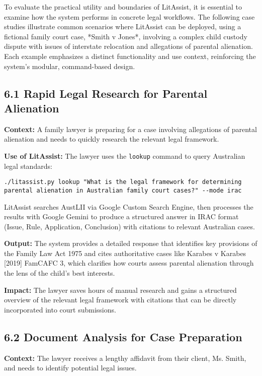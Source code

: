 \documentclass[12pt,a4paper]{article}
\begin{document}
To evaluate the practical utility and boundaries of LitAssist, it is essential to examine how the system performs in concrete legal workflows. The following case studies illustrate common scenarios where LitAssist can be deployed, using a fictional family court case, *Smith v Jones*, involving a complex child custody dispute with issues of interstate relocation and allegations of parental alienation. Each example emphasizes a distinct functionality and use context, reinforcing the system's modular, command-based design.

\subsection*{6.1 Rapid Legal Research for Parental Alienation}

\textbf{Context:} A family lawyer is preparing for a case involving allegations of parental alienation and needs to quickly research the relevant legal framework.

\textbf{Use of LitAssist:} The lawyer uses the \texttt{lookup} command to query Australian legal standards:

\begin{verbatim}
./litassist.py lookup "What is the legal framework for determining 
parental alienation in Australian family court cases?" --mode irac
\end{verbatim}

LitAssist searches AustLII via Google Custom Search Engine, then processes the results with Google Gemini to produce a structured answer in IRAC format (Issue, Rule, Application, Conclusion) with citations to relevant Australian cases.

\textbf{Output:} The system provides a detailed response that identifies key provisions of the Family Law Act 1975 and cites authoritative cases like Karabes v Karabes [2019] FamCAFC 3, which clarifies how courts assess parental alienation through the lens of the child's best interests.

\textbf{Impact:} The lawyer saves hours of manual research and gains a structured overview of the relevant legal framework with citations that can be directly incorporated into court submissions.

\subsection*{6.2 Document Analysis for Case Preparation}

\textbf{Context:} The lawyer receives a lengthy affidavit from their client, Ms. Smith, and needs to identify potential legal issues.
\end{document}
